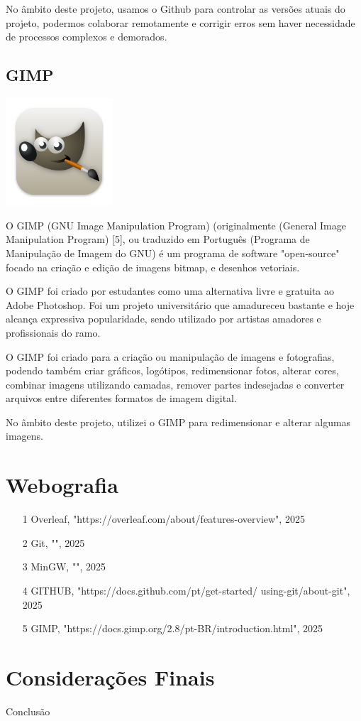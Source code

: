 \documentclass[a4paper,12pt]{article}
\begin{document}
No âmbito deste projeto, usamos o Github para controlar as versões atuais do projeto, podermos colaborar remotamente e corrigir erros sem haver necessidade de processos complexos e demorados.

\subsection{GIMP}
    \includegraphics[width=0.3\textwidth]{gimp.png} %
    \vspace{0.5cm}

O GIMP (GNU Image Manipulation Program) (originalmente (General Image Manipulation Program) [5], ou traduzido em Português (Programa de Manipulação de Imagem do GNU) é um programa de software "open-source" focado na criação e edição de imagens bitmap, e desenhos vetoriais.

O GIMP foi criado por estudantes como uma alternativa livre e gratuita ao Adobe Photoshop. Foi um projeto universitário que amadureceu bastante e hoje alcança expressiva popularidade, sendo utilizado por artistas amadores e profissionais do ramo.

O GIMP foi criado para a criação ou manipulação de imagens e fotografias, podendo também criar gráficos, logótipos, redimensionar fotos, alterar cores, combinar imagens utilizando camadas, remover partes indesejadas e converter arquivos entre diferentes formatos de imagem digital.

No âmbito deste projeto, utilizei o GIMP para redimensionar e alterar algumas imagens.

\section{Webografia}
\begin{itemize}
    \item [1] Overleaf, "https://overleaf.com/about/features-overview", 2025

    \item [2] Git, "", 2025

    \item [3] MinGW, "", 2025
    
    \item [4] GITHUB, "https://docs.github.com/pt/get-started/
    \newline
    using-git/about-git", 2025
    
    \item [5] GIMP, "https://docs.gimp.org/2.8/pt-BR/introduction.html", 2025
    
\end{itemize}

\section{Considerações Finais}

Conclusão
\end{document}
